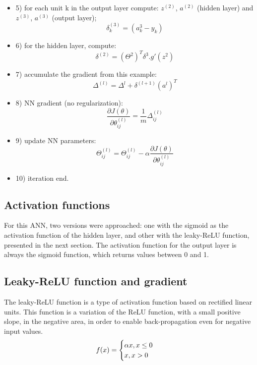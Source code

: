 \documentclass[conference]{IEEEtran}
\begin{document}
\begin{itemize}
    \item 5) for each unit k in the output layer compute: $z^{(2)}$, $a^{(2)}$ (hidden layer) and
$z^{(3)}$, $a^{(3)}$ (output layer);
    \begin{equation}
    \delta^{(3)}_k = (a^{3}_k - y_k) 
    \label{eq13}
    \end{equation}
    \item 6) for the hidden layer, compute: 
    \begin{equation}
    \delta^{(2)} = (\Theta^{2})^{T}\delta^{3}.g'(z^{2})
    \label{eq14}
    \end{equation}
    \item 7) accumulate the gradient from this example:
    \begin{equation}
    \Delta^{(l)} = \Delta^{l}+\delta^{(l+1)}(a^{l})^{T}
    \label{eq15}
    \end{equation}
    \item 8) NN gradient (no regularization):
    \begin{equation}
     \frac{\partial J(\theta)}{\partial \theta_{ij}^{(l)}} = \frac{1}{m} \Delta_{ij}^{(l)}
    \label{eq16}
    \end{equation}
    \item 9) update NN parameters:
    \begin{equation}
    \Theta_{ij}^{(l)} = \Theta_{ij}^{(l)} -\alpha \frac{\partial J(\theta)}{\partial \theta_{ij}^{(l)}}
    \label{eq17}
    \end{equation}
    \item 10) iteration end.
\end{itemize}

\subsection{Activation functions}
For this ANN, two versions were approached: one with the sigmoid as the activation function of the hidden layer, and other with the leaky-ReLU function, presented in the next section. The activation function for the output layer is always the sigmoid function, which returns values between 0 and 1.

\subsection{Leaky-ReLU function and gradient}
The leaky-ReLU function\cite{b3} is a type of activation function based on rectified linear units. This function is a variation of the ReLU function, with a small positive slope, in the negative area, in order to enable back-propagation even for negative input values. 
\begin{equation}
\centering
    f (x) = 
    \begin{cases}
      \alpha x   , x \leq 0 \\
      x ,  x > 0
    \end{cases}\,
\end{equation}
\end{document}
